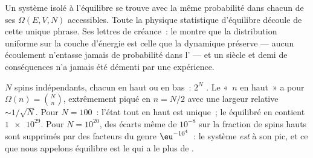 \begin{theorem}\label{thm:b3:microcanonical-ensemble:postulate}
Un système isolé à l'équilibre se trouve avec la même probabilité dans
chacun de ses $\Omega(E, V, N)$  accessibles. Toute la
physique statistique d'équilibre découle de cette unique phrase. Ses
lettres de créance~: le  montre que la
distribution uniforme sur la couche d'énergie est celle que la
dynamique préserve --- aucun écoulement n'entasse jamais de
probabilité dans l' --- et un siècle et demi de
conséquences n'a jamais été démenti par une expérience.
\end{theorem}
\admitted

\begin{example}\label{ex:b3:microcanonical-ensemble:spins}
$N$ spins indépendants, chacun en haut ou en bas~: $2^N$ .
Le  «~$n$ en haut~» a pour  $\Omega(n) = \binom Nn$,
extrêmement piqué en $n = N/2$ avec une largeur relative
$\sim1/\sqrt N$. Pour $N = 100$~: l'état tout en haut est unique~; le
 équilibré en contient $\num{1e29}$. Pour $N = 10^{20}$, des
écarts même de $10^{-8}$ sur la fraction de spins hauts sont supprimés
par des facteurs du genre $\eu^{-10^4}$~: le système \emph{est} à son
pic, et ce que nous appelons équilibre est le  qui a le plus
de .
\end{example}


